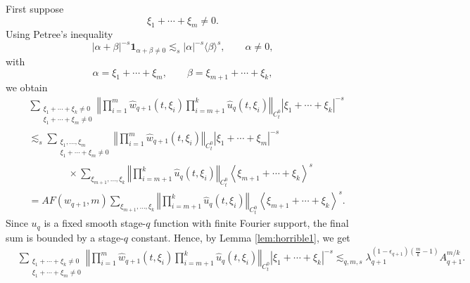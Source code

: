 \documentclass[12pt,reqno,letterpaper]{amsart}
\numberwithin{equation}{section}
\newcommand{\1}{{\bf 1}}
\newcommand{\2}{{\bf 2}}
\theoremstyle{remark}
\theoremstyle{remark}
\begin{document}
First suppose
\[
    \xi_1+\cdots+\xi_m\neq0.
\]
Using Petree's inequality
\[
    |\alpha+\beta|^{-s}\mathbf 1_{\alpha+\beta\neq0}
    \lesssim_s
    |\alpha|^{-s}\langle \beta\rangle^s,
    \qquad \alpha\neq0,
\]
with
\[
    \alpha=\xi_1+\cdots+\xi_m,
    \qquad
    \beta=\xi_{m+1}+\cdots+\xi_k,
\]
we obtain
\[
\begin{aligned}
&\sum_{\substack{\xi_1+\cdots+\xi_k\neq0\\ \xi_1+\cdots+\xi_m\neq0}}
\left\Vert
\prod_{i=1}^m \hat{w}_{q+1}(t,\xi_i)
\prod_{i=m+1}^k \hat{u}_q(t,\xi_i)
\right\Vert_{C_t^0}
|\xi_1+\cdots+\xi_k|^{-s}
\\
&\lesssim_s
\sum_{\substack{\xi_1,\ldots,\xi_m\\ \xi_1+\cdots+\xi_m\neq0}}
\left\Vert
\prod_{i=1}^m \hat{w}_{q+1}(t,\xi_i)
\right\Vert_{C_t^0}
|\xi_1+\cdots+\xi_m|^{-s}
\\
&\qquad\qquad\times
\sum_{\xi_{m+1},\ldots,\xi_k}
\left\Vert
\prod_{i=m+1}^k \hat{u}_q(t,\xi_i)
\right\Vert_{C_t^0}
\left\langle \xi_{m+1}+\cdots+\xi_k\right\rangle^s
\\
&=
AF(w_{q+1},m)
\sum_{\xi_{m+1},\ldots,\xi_k}
\left\Vert
\prod_{i=m+1}^k \hat{u}_q(t,\xi_i)
\right\Vert_{C_t^0}
\left\langle \xi_{m+1}+\cdots+\xi_k\right\rangle^s.
\end{aligned}
\]
Since $u_q$ is a fixed smooth stage-$q$ function with finite Fourier support, the final sum is bounded by a stage-$q$ constant. Hence, by Lemma \ref{lem:horrible1}, we get
\[
\begin{aligned}
&\sum_{\substack{\xi_1+\cdots+\xi_k\neq0\\ \xi_1+\cdots+\xi_m\neq0}}
\left\Vert
\prod_{i=1}^m \hat{w}_{q+1}(t,\xi_i)
\prod_{i=m+1}^k \hat{u}_q(t,\xi_i)
\right\Vert_{C_t^0}
|\xi_1+\cdots+\xi_k|^{-s} \lesssim_{q,m,s}
\lambda_{q+1}^{(1-\epsilon_{q+1})(\frac mk-1)}
A_{q+1}^{m/k}.
\end{aligned}
\]
\end{document}
